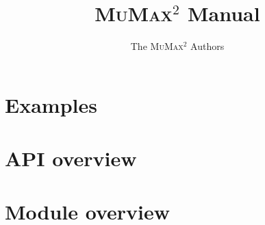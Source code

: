 \documentclass[a4paper, twoside]{article}
\newcommand{\mumax}{\textsc{MuMax}$^2$\xspace}
\begin{document}
\hypersetup{breaklinks=true}
\setlength{\parindent}{0cm}

\title{\mumax Manual}
\author{The \mumax Authors}
\maketitle


\tableofcontents




\section{Examples} \label{examples}



\section{API overview}


\section{Module overview}


\appendix

%
\printindex
\end{document}
